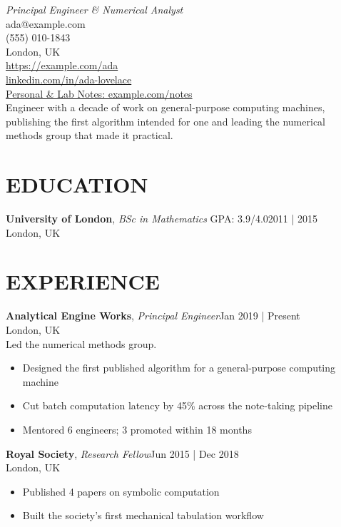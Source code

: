 \documentclass[line,margin]{res}
\begin{document}
      \begin{resume}
        \vspace{-5mm}
        {\large \sl Principal Engineer \& Numerical Analyst}\\[2pt]
      ada@example.com \\
(555) 010-1843 \\
London, UK \\
\href{https://example.com/ada}{https://example.\allowbreak{}com/\allowbreak{}ada} \\
\href{https://linkedin.com/in/ada-lovelace}{linkedin.\allowbreak{}com/\allowbreak{}in/\allowbreak{}ada-\allowbreak{}lovelace} \\
\href{https://example.com/notes}{Personal \& Lab Notes: example.\allowbreak{}com/\allowbreak{}notes}\\[2pt]
      Engineer with a decade of work on general-purpose computing machines, publishing the first algorithm intended for one and leading the numerical methods group that made it practical.
      \vspace{2mm}
        
\vspace{3pt}
\section{EDUCATION}
\textbf{University of London}, {\sl BSc in Mathematics} GPA: 3.9/4.0\hfill 2011 | 2015\\London, UK
\vspace{3pt}
      \section{EXPERIENCE}
      \textbf{Analytical Engine Works}, {\sl Principal Engineer}\hfill Jan 2019 | Present\\London, UK\\Led the numerical methods group.\\\begin{itemize} \itemsep 2pt
\item Designed the first published algorithm for a general-purpose computing machine
\item Cut batch computation latency by 45\% across the note-taking pipeline
\item Mentored 6 engineers; 3 promoted within 18 months
\end{itemize}
      \textbf{Royal Society}, {\sl Research Fellow}\hfill Jun 2015 | Dec 2018\\London, UK\\\begin{itemize} \itemsep 2pt
\item Published 4 papers on symbolic computation
\item Built the society's first mechanical tabulation workflow
\end{itemize}
\vspace{3pt}

\end{resume}
\end{document}
